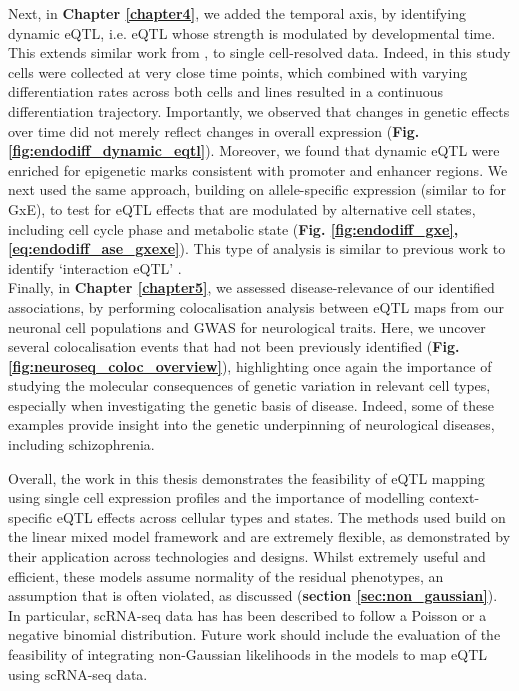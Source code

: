 Next, in \textbf{Chapter \ref{chapter4}}, we added the temporal axis, by identifying dynamic eQTL, i.e. eQTL whose strength is modulated by developmental time.
This extends similar work from \cite{francesconi2014effects, strober2019dynamic}, to single cell-resolved data.
Indeed, in this study cells were collected at very close time points, which combined with varying differentiation rates across both cells and lines resulted in a continuous differentiation trajectory.
Importantly, we observed that changes in genetic effects over time did not merely reflect changes in overall expression (\textbf{Fig. \ref{fig:endodiff_dynamic_eqtl}}).
Moreover, we found that dynamic eQTL were enriched for epigenetic marks consistent with promoter and enhancer regions.
We next used the same approach, building on allele-specific expression (similar to \cite{knowles2017allele} for GxE), to test for eQTL effects that are modulated by alternative cell states, including cell cycle phase and metabolic state (\textbf{Fig. \ref{fig:endodiff_gxe}, \ref{eq:endodiff_ase_gxexe}}).
This type of analysis is similar to previous work to identify `interaction eQTL' \cite{zhernakova2017identification, van2018single}. \\

Finally, in \textbf{Chapter \ref{chapter5}}, we assessed disease-relevance of our identified associations, by performing colocalisation analysis between eQTL maps from our neuronal cell populations and GWAS for neurological traits.
Here, we uncover several colocalisation events that had not been previously identified (\textbf{Fig. \ref{fig:neuroseq_coloc_overview}}), highlighting once again the importance of studying the molecular consequences of genetic variation in relevant cell types, especially when investigating the genetic basis of disease.
Indeed, some of these examples provide insight into the genetic underpinning of neurological diseases, including schizophrenia.

Overall, the work in this thesis demonstrates the feasibility of eQTL mapping using single cell expression profiles and the importance of modelling context-specific eQTL effects across cellular types and states.
The methods used build on the linear mixed model framework and are extremely flexible, as demonstrated by their application across technologies and designs. 
Whilst extremely useful and efficient, these models assume normality of the residual phenotypes, an assumption that is often violated, as discussed (\textbf{section \ref{sec:non_gaussian}}).
In particular, scRNA-seq data has has been described to follow a Poisson or a negative binomial \cite{grun2014validation, hafemeister2019normalization, svensson2020droplet} distribution.
Future work should include the evaluation of the feasibility of integrating non-Gaussian likelihoods in the models to map eQTL using scRNA-seq data. \\


